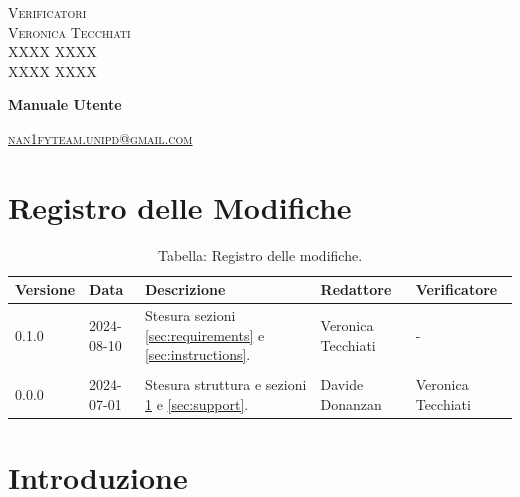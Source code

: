 \documentclass[8pt]{article}
\begin{document}
\begin{titlepage}
\begin{minipage}[t]{0.47\textwidth}
		{\large{\textsc{Verificatori}}
			\vspace{3mm}
			{\\\large{\textsc{Veronica Tecchiati}\\}} 
			{\large{\textsc{XXXX XXXX}\\}} 
			{\large{\textsc{XXXX XXXX}\\}}
			
		}
		\vspace{2mm}\vspace{2mm}
	\end{minipage}
	\vspace{4cm}
	\begin{center}
		\begin{flushright}
			{\fontsize{30pt}{52pt}\selectfont \textbf{Manuale Utente}} %
		\end{flushright}
		\vspace{3cm}
	\end{center}
	\vspace{10 cm}
	{\small \textsc{\href{mailto: nan1fyteam.unipd@gmail.com}{nan1fyteam.unipd@gmail.com}}}
\end{titlepage}
\pagestyle{mystyle}
\section*{Registro delle Modifiche}
\begin{table}[ht!]	
	\centering
	\begin{tabular}{p{1.2cm} p{2cm} p{5cm} p{3cm} p{3cm}}
		\toprule
		\textbf{Versione}& \textbf{Data} & \textbf{Descrizione} & \textbf{Redattore} & \textbf{Verificatore} \\
		\midrule
            0.1.0 & 2024-08-10 & Stesura sezioni \ref{sec:requirements} e \ref{sec:instructions}. & Veronica Tecchiati & - \\\\
		    0.0.0 & 2024-07-01 & Stesura struttura e sezioni \ref{sec:intro} e \ref{sec:support}. & Davide Donanzan & Veronica Tecchiati \\
		\bottomrule
	\end{tabular}
	\caption*{Tabella: Registro delle modifiche.}
	\label{table:Registro delle modifiche}
\end{table}
\newpage
\tableofcontents
\newpage
\listoffigures
\newpage
\listoftables
\newpage
\justifying
\section{Introduzione}\label{sec:intro}
\end{document}
